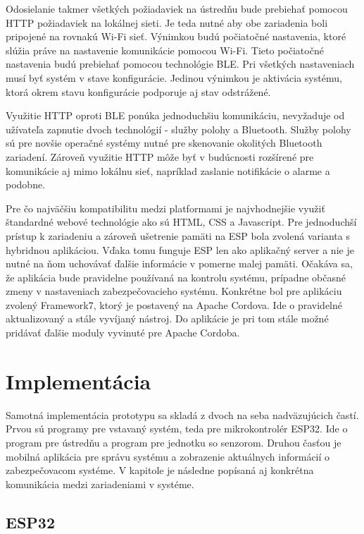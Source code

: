 Odosielanie takmer všetkých požiadaviek na ústredňu bude prebiehať pomocou HTTP požiadaviek na lokálnej sieti. Je teda nutné aby obe zariadenia boli pripojené na rovnakú Wi-Fi sieť. Výnimkou budú počiatočné nastavenia, ktoré slúžia práve na nastavenie komunikácie pomocou Wi-Fi. Tieto počiatočné nastavenia budú prebiehať pomocou technológie BLE. Pri všetkých nastaveniach musí byť systém v stave konfigurácie. Jedinou výnimkou je aktivácia systému, ktorá okrem stavu konfigurácie podporuje aj stav odstrážené.

Využitie HTTP oproti BLE ponúka jednoduchšiu komunikáciu, nevyžaduje od užívateľa zapnutie dvoch technológií - služby polohy a Bluetooth. Služby polohy sú pre novšie operačné systémy nutné pre skenovanie okolitých Bluetooth zariadení. Zároveň využitie HTTP môže byť v budúcnosti rozšírené pre komunikácie aj mimo lokálnu sieť, napríklad zaslanie notifikácie o alarme a podobne. 

Pre čo najväčšiu kompatibilitu medzi platformami je najvhodnejšie využiť štandardné webové technológie ako sú HTML, CSS a Javascript. Pre jednoduchší prístup k zariadeniu a zároveň ušetrenie pamäti na ESP bola zvolená varianta s hybridnou aplikáciou. Vďaka tomu funguje ESP len ako aplikačný server a nie je nutné na ňom uchovávať ďalšie informácie v pomerne malej pamäti. Očakáva sa, že aplikácia bude pravidelne používaná na kontrolu systému, prípadne občasné zmeny v nastaveniach zabezpečovacieho systému. Konkrétne bol pre aplikáciu zvolený Framework7, ktorý je postavený na Apache Cordova. Ide o pravidelné aktualizovaný a stále vyvíjaný nástroj. Do aplikácie je pri tom stále možné pridávať ďalšie moduly vyvinuté pre Apache Cordoba.

\chapter{Implementácia}

Samotná implementácia prototypu sa skladá z dvoch na seba nadväzujúcich častí. Prvou sú programy pre vstavaný systém, teda pre mikrokontrolér ESP32. Ide o program pre ústredňu a program pre jednotku so senzorom. Druhou časťou je mobilná aplikácia pre správu systému a zobrazenie aktuálnych informácií o zabezpečovacom systéme. V kapitole je následne popísaná aj konkrétna komunikácia medzi zariadeniami v systéme.

\section{ESP32}


